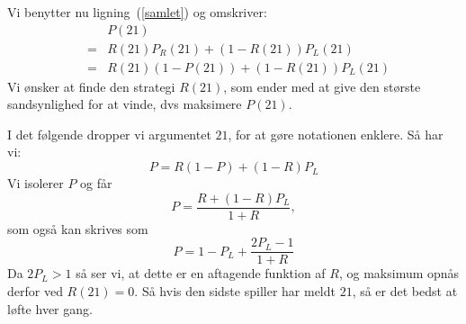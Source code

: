 \documentclass[12pt,oneside,a4paper]{article}
\newcommand{\bas}{\begin{eqnarray*}}
\newcommand{\eas}{\end{eqnarray*}}
\begin{document}
Vi benytter nu ligning~(\ref{samlet}) og omskriver:
\bas
 && P(21) \\
&=& R(21) P_R(21) + (1-R(21)) P_L(21) \\ 
&=& R(21) (1-P(21)) + (1-R(21)) P_L(21)
\eas
Vi ønsker at finde den strategi $R(21)$, som ender med at give den største
sandsynlighed for at vinde, dvs maksimere $P(21)$.

I det følgende dropper vi argumentet $21$, for at gøre notationen enklere.
Så har vi:
$$
P = R(1-P) + (1-R)P_L
$$
Vi isolerer $P$ og får
$$
P = \frac{R+(1-R)P_L}{1+R},
$$
som også kan skrives som
$$
P = 1 - P_L + \frac{2P_L-1}{1+R}
$$
Da $2P_L>1$ så ser vi, at dette er en aftagende funktion af $R$, og maksimum
opnås derfor ved $R(21) = 0$. Så hvis den sidste spiller har meldt $21$, så er
det bedst at løfte hver gang.
\end{document}
